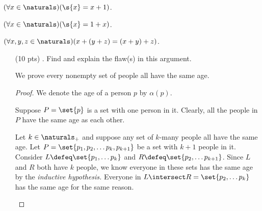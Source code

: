 {  $(\forall x \in \naturals)(\s{x} = x + 1)$.

  $(\forall x \in \naturals)(\s{x} = 1 + x)$.

  $(\forall x, y, z \in \naturals)(x + (y + z) = (x + y) + z)$.
}

\begin{enumerate}

  \item[(10 pts) \quad 1.]
    Find and explain the flaw(s) in this argument.
    \begin{mdframed}
      We prove every nonempty set of people all have the same age.
      \begin{proof}
        We denote the age of a person $p$ by $\alpha(p)$.

        \begin{case}
          Suppose $P = \set{p}$ is a set with one person in it.
          Clearly, all the people in $P$ have the same age as each other.
        \end{case}
        \begin{case}
          Let $k \in \naturals_+$ and suppose any set of $k$-many people all have the same age.
          Let $P = \set{p_1, p_2, \dots p_k, p_{k + 1}}$ be a set with $k + 1$ people in it.
          Consider $L \defeq \set{p_1, \dots p_k}$ and $R \defeq \set{p_2, \dots p_{k + 1}}$.
          Since $L$ and $R$ both have $k$ people, we know everyone in these sets has the same age by the \emph{inductive hypothesis.}
          Everyone in $L \intersect R = \set{p_2, \dots p_k}$ has the same age for the same reason.


\end{case}
\end{proof}
\end{mdframed}
\end{enumerate}
